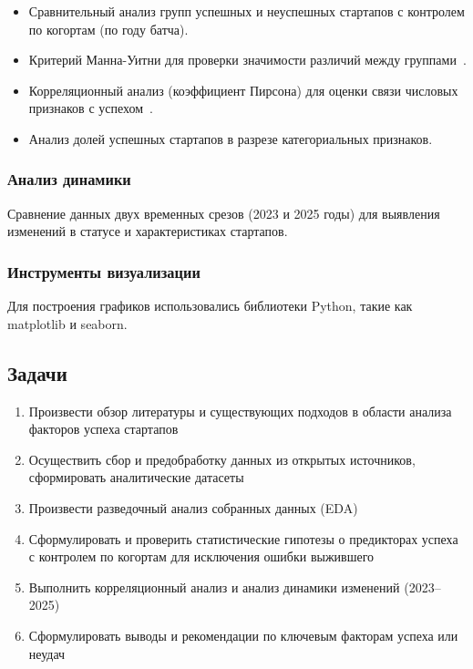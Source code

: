 \begin{itemize}
    \item Сравнительный анализ групп успешных и неуспешных стартапов с контролем по когортам (по году батча).
    \item Критерий Манна-Уитни для проверки значимости различий между группами~\cite{mann-whitney}.
    \item Корреляционный анализ (коэффициент Пирсона) для оценки связи числовых признаков с успехом~\cite{pearson-corr}.
    \item Анализ долей успешных стартапов в разрезе категориальных признаков.
\end{itemize}

\subsubsection{Анализ динамики}

Сравнение данных двух временных срезов (2023 и 2025 годы) для выявления изменений в статусе и характеристиках стартапов.

\subsubsection{Инструменты визуализации}

Для построения графиков использовались библиотеки Python, такие как matplotlib и seaborn.


\subsection{Задачи}

\begin{enumerate}
    \item Произвести обзор литературы и существующих подходов в области анализа факторов успеха стартапов
    \item Осуществить сбор и предобработку данных из открытых источников, сформировать аналитические датасеты
    \item Произвести разведочный анализ собранных данных (EDA)
    \item Сформулировать и проверить статистические гипотезы о предикторах успеха с контролем по когортам для исключения ошибки выжившего
    \item Выполнить корреляционный анализ и анализ динамики изменений (2023--2025)
    \item Сформулировать выводы и рекомендации по ключевым факторам успеха или неудач
\end{enumerate}

